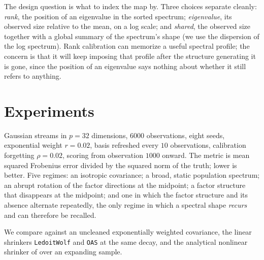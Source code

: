 \documentclass[11pt]{article}
\begin{document}
The design question is what to index the map by. Three choices separate cleanly:
\emph{rank}, the position of an eigenvalue in the sorted spectrum; \emph{eigenvalue}, its observed
size relative to the mean, on a log scale; and \emph{shared}, the observed size together with a
global summary of the spectrum's shape (we use the dispersion of the log spectrum). Rank calibration
can memorize a useful spectral profile; the concern is that it will keep imposing that profile after
the structure generating it is gone, since the position of an eigenvalue says nothing about whether
it still refers to anything.

\section{Experiments}

Gaussian streams in $p = 32$ dimensions, $6000$ observations, eight seeds, exponential weight
$r = 0.02$, basis refreshed every $10$ observations, calibration forgetting $\rho = 0.02$, scoring
from observation $1000$ onward. The metric is mean squared Frobenius error divided by the squared
norm of the truth; lower is better. Five regimes: an isotropic covariance; a broad, static
population spectrum; an abrupt rotation of the factor directions at the midpoint; a factor structure
that disappears at the midpoint; and one in which the factor structure and its absence alternate
repeatedly, the only regime in which a spectral shape \emph{recurs} and can therefore be recalled.

We compare against an uncleaned exponentially weighted covariance, the linear shrinkers
\texttt{LedoitWolf} and \texttt{OAS} at the same decay, and the analytical nonlinear shrinker of
\citet{ledoitwolf2020analytical} over an expanding sample.
\end{document}
